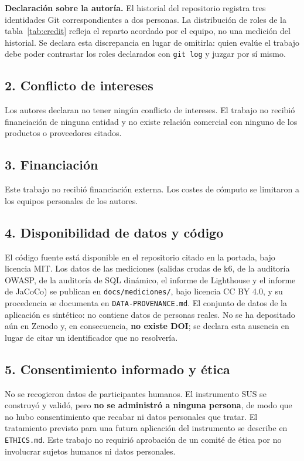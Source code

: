 \documentclass[11pt,a4paper]{article}
\begin{document}
\noindent\textbf{Declaración sobre la autoría.} El historial del repositorio
registra tres identidades Git correspondientes a dos personas. La distribución
de roles de la tabla~\ref{tab:credit} refleja el reparto acordado por el equipo,
no una medición del historial. Se declara esta discrepancia en lugar de
omitirla: quien evalúe el trabajo debe poder contrastar los roles declarados con
\texttt{git log} y juzgar por sí mismo.

\subsection*{2. Conflicto de intereses}
Los autores declaran no tener ningún conflicto de intereses. El trabajo no
recibió financiación de ninguna entidad y no existe relación comercial con
ninguno de los productos o proveedores citados.

\subsection*{3. Financiación}
Este trabajo no recibió financiación externa. Los costes de cómputo se
limitaron a los equipos personales de los autores.

\subsection*{4. Disponibilidad de datos y código}
El código fuente está disponible en el repositorio citado en la portada, bajo
licencia MIT. Los datos de las mediciones (salidas crudas de k6, de la auditoría
OWASP, de la auditoría de SQL dinámico, el informe de Lighthouse y el informe de
JaCoCo) se publican en \texttt{docs\-/mediciones\-/}, bajo licencia CC BY 4.0, y
su procedencia se documenta en \texttt{DATA-PROVENANCE.md}. El conjunto de datos
de la aplicación es sintético: no contiene datos de personas reales. No se ha
depositado aún en Zenodo y, en consecuencia, \textbf{no existe DOI}; se declara
esta ausencia en lugar de citar un identificador que no resolvería.

\subsection*{5. Consentimiento informado y ética}
No se recogieron datos de participantes humanos. El instrumento SUS se
construyó y validó, pero \textbf{no se administró a ninguna persona}, de modo
que no hubo consentimiento que recabar ni datos personales que tratar. El
tratamiento previsto para una futura aplicación del instrumento se describe en
\texttt{ETHICS.md}. Este trabajo no requirió aprobación de un comité de ética
por no involucrar sujetos humanos ni datos personales.
\end{document}
